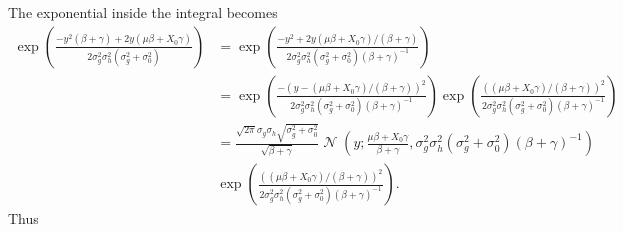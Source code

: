 \documentclass[a4paper]{amsart}
\DeclareMathOperator{\N}{\mathcal{N}}
\begin{document}
The exponential inside the integral becomes
\begin{align*}
\exp\left( \frac{-y^2(\beta + \gamma)+2y(\mu \beta + X_0\gamma)}{2\sigma_g^2\sigma_h^2(\sigma_g^2 + \sigma_0^2)}\right) &= \exp\left( \frac{-y^2+2y(\mu \beta + X_0\gamma)/(\beta + \gamma)}{2\sigma_g^2\sigma_h^2(\sigma_g^2 + \sigma_0^2)(\beta + \gamma)^{-1}}\right)\\
&= \exp\left( \frac{-\left(y - (\mu \beta + X_0\gamma)/(\beta + \gamma)\right)^2}{2\sigma_g^2\sigma_h^2(\sigma_g^2 + \sigma_0^2)(\beta + \gamma)^{-1}}\right)\exp\left( \frac{\left((\mu \beta + X_0\gamma)/(\beta + \gamma)\right)^2}{2\sigma_g^2\sigma_h^2(\sigma_g^2 + \sigma_0^2)(\beta + \gamma)^{-1}}\right)\\
&= \frac{\sqrt{2\pi}\sigma_g\sigma_h\sqrt{\sigma_g^2 + \sigma_0^2}}{\sqrt{\beta + \gamma}}\N\left(y; \frac{\mu \beta + X_0\gamma}{\beta + \gamma}, \sigma_g^2\sigma_h^2(\sigma_g^2 + \sigma_0^2)(\beta + \gamma)^{-1}\right)\\
&\exp\left( \frac{\left((\mu \beta + X_0\gamma)/(\beta + \gamma)\right)^2}{2\sigma_g^2\sigma_h^2(\sigma_g^2 + \sigma_0^2)(\beta + \gamma)^{-1}}\right).
\end{align*}
Thus
\end{document}
